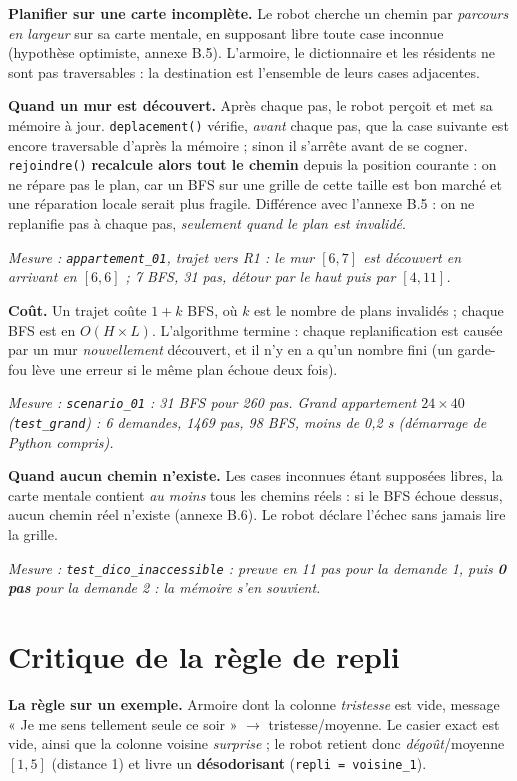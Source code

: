 \documentclass[11pt,a4paper]{article}
\newcommand{\code}[1]{\texttt{#1}}
\newcommand{\cle}[1]{\textbf{#1}}
\newcommand{\mesure}[1]{\par\noindent\small\textit{Mesure : #1}\normalsize\par}
\begin{document}
\textbf{Planifier sur une carte incomplète.} Le robot cherche un chemin par \emph{parcours en largeur} sur sa carte mentale, en supposant libre toute case inconnue (hypothèse optimiste, annexe B.5). L'armoire, le dictionnaire et les résidents ne sont pas traversables : la destination est l'ensemble de leurs cases adjacentes.

\textbf{Quand un mur est découvert.} Après chaque pas, le robot perçoit et met sa mémoire à jour. \code{deplacement()} vérifie, \emph{avant} chaque pas, que la case suivante est encore traversable d'après la mémoire ; sinon il s'arrête avant de se cogner. \code{rejoindre()} \cle{recalcule alors tout le chemin} depuis la position courante : on ne répare pas le plan, car un BFS sur une grille de cette taille est bon marché et une réparation locale serait plus fragile. Différence avec l'annexe B.5 : on ne replanifie pas à chaque pas, \emph{seulement quand le plan est invalidé}.
\mesure{\code{appartement\_01}, trajet vers R1 : le mur $[6,7]$ est découvert en arrivant en $[6,6]$ ; 7 BFS, 31 pas, détour par le haut puis par $[4,11]$.}

\textbf{Coût.} Un trajet coûte $1 + k$ BFS, où $k$ est le nombre de plans invalidés ; chaque BFS est en $O(H \times L)$. L'algorithme termine : chaque replanification est causée par un mur \emph{nouvellement} découvert, et il n'y en a qu'un nombre fini (un garde-fou lève une erreur si le même plan échoue deux fois).
\mesure{\code{scenario\_01} : 31 BFS pour 260 pas. Grand appartement $24\times40$ (\code{test\_grand}) : 6 demandes, 1469 pas, 98 BFS, moins de 0,2 s (démarrage de Python compris).}

\textbf{Quand aucun chemin n'existe.} Les cases inconnues étant supposées libres, la carte mentale contient \emph{au moins} tous les chemins réels : si le BFS échoue dessus, aucun chemin réel n'existe (annexe B.6). Le robot déclare l'échec sans jamais lire la grille.
\mesure{\code{test\_dico\_inaccessible} : preuve en 11 pas pour la demande 1, puis \textbf{0 pas} pour la demande 2 : la mémoire s'en souvient.}

\section{Critique de la règle de repli}

\textbf{La règle sur un exemple.} Armoire dont la colonne \emph{tristesse} est vide, message « Je me sens tellement seule ce soir » $\rightarrow$ tristesse/moyenne. Le casier exact est vide, ainsi que la colonne voisine \emph{surprise} ; le robot retient donc \emph{dégoût}/moyenne $[1,5]$ (distance 1) et livre un \cle{désodorisant} (\code{repli = voisine\_1}).
\end{document}

